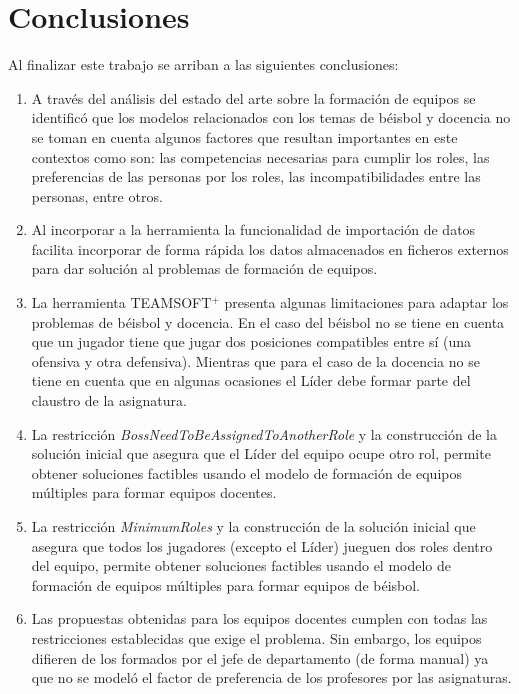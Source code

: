 \chapter*{Conclusiones}
Al finalizar este trabajo se arriban a las siguientes conclusiones:
\begin{enumerate}
	\item A través del análisis del estado del arte sobre la formación de equipos se identificó que los modelos relacionados con los temas de béisbol y docencia no se toman en cuenta algunos factores que resultan importantes en este contextos como son: las competencias necesarias para cumplir los roles, las preferencias de las personas por los roles, las incompatibilidades entre las personas, entre otros.

	\item Al incorporar a la herramienta la funcionalidad de importación de datos facilita incorporar de forma rápida los datos almacenados en ficheros externos para dar solución al problemas de formación de equipos.

	\item La herramienta TEAMSOFT$^+$ presenta algunas limitaciones para adaptar los problemas de béisbol y docencia. En el caso del béisbol no se tiene en cuenta que un jugador tiene que jugar dos posiciones compatibles entre sí (una ofensiva y otra defensiva). Mientras que para el caso de la docencia no se tiene en cuenta que en algunas ocasiones el Líder debe formar parte del claustro de la asignatura.

	\item La restricción \textit{BossNeedToBeAssignedToAnotherRole} y la construcción de la solución inicial que asegura que el Líder del equipo ocupe otro rol, permite obtener soluciones factibles usando el modelo de formación de  equipos múltiples para formar equipos docentes.

	\item La restricción \textit{MinimumRoles} y la construcción de la solución inicial que asegura que todos los jugadores (excepto el Líder) jueguen dos roles dentro del equipo, permite obtener soluciones factibles usando el modelo de formación de equipos múltiples para formar equipos de béisbol.

	\item Las propuestas obtenidas para los equipos docentes cumplen con todas las restricciones establecidas que exige el problema. Sin embargo, los equipos difieren de los formados por el jefe de departamento (de forma manual) ya que no se modeló el factor de preferencia de los profesores por las asignaturas.
	

\end{enumerate}
